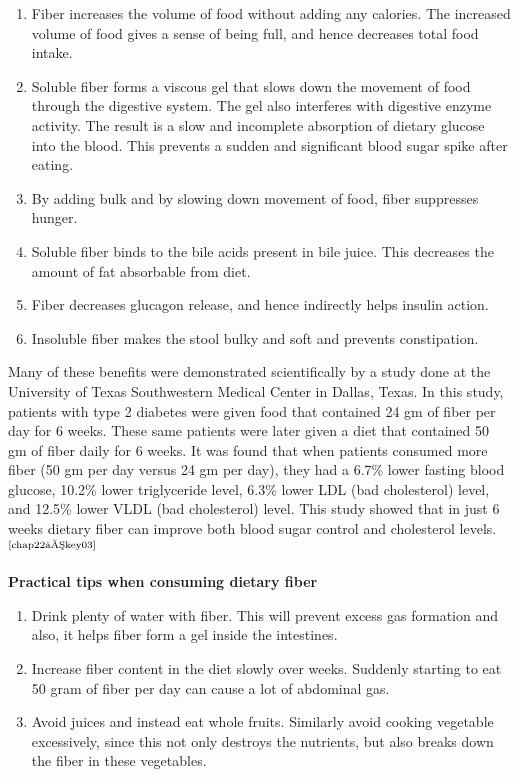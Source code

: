 \begin{enumerate}[•]
\itemsep=0pt
\item Fiber increases the volume of food without adding any calories. The increased volume of food gives a sense of being full, and hence decreases total food intake.
\item Soluble fiber forms a viscous gel that slows down the movement of food through the digestive system. The gel also interferes with digestive enzyme activity. The result is a slow and incomplete absorption of dietary glucose into the blood. This prevents a sudden and significant blood sugar spike after eating.
\item By adding bulk and by slowing down movement of food, fiber suppresses hunger.
\item Soluble fiber binds to the bile acids present in bile juice. This decreases the amount of fat absorbable from diet.
\item Fiber decreases glucagon release, and hence indirectly helps insulin action.
\item Insoluble fiber makes the stool bulky and soft and prevents constipation.
\end{enumerate}

Many of these benefits were demonstrated scientifically by a study done at the University of Texas Southwestern Medical Center in Dallas, Texas. In this study, patients with type 2 diabetes were given food that contained 24 gm of fiber per day for 6 weeks. These same patients were later given a diet that contained 50 gm of fiber daily for 6 weeks. It was found that when patients consumed more fiber (50 gm per day versus 24 gm per day), they had a 6.7\% lower fasting blood glucose, 10.2\% lower triglyceride level, 6.3\% lower LDL (bad cholesterol) level, and 12.5\% lower VLDL (bad cholesterol) level. This study showed that in just 6 weeks dietary fiber can improve both blood sugar control and cholesterol levels.$^{\text{\cite{chap22–key03}}}$

\noindent\textbf{Practical tips when consuming dietary fiber}

\begin{enumerate}[•]
\itemsep=0pt
\item Drink plenty of water with fiber. This will prevent excess gas formation and also, it helps fiber form a gel inside the intestines.
\item Increase fiber content in the diet slowly over weeks. Suddenly starting to eat 50 gram of fiber per day can cause a lot of abdominal gas.
\item Avoid juices and instead eat whole fruits. Similarly avoid cooking vegetable excessively, since this not only destroys the nutrients, but also breaks down the fiber in these vegetables.
\end{enumerate}

